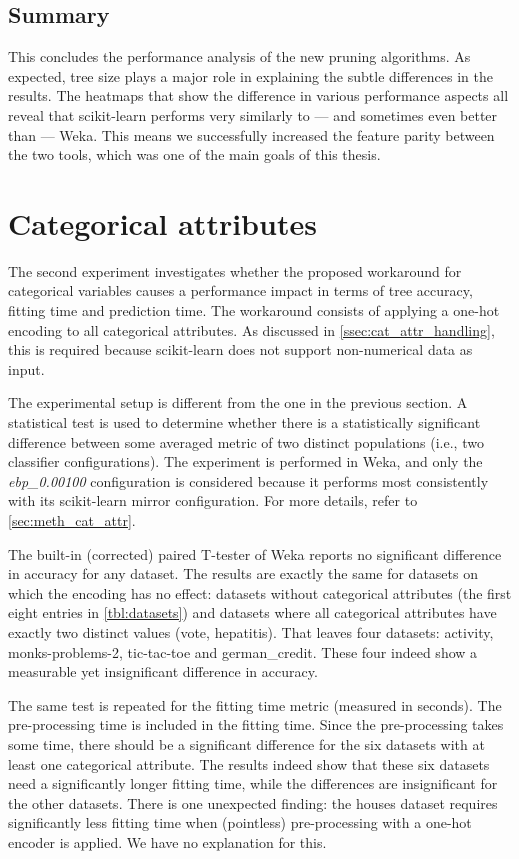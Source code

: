 \subsection{Summary}
This concludes the performance analysis of the new pruning algorithms. As expected, tree size plays a major role in explaining the subtle differences in the results. The heatmaps that show the difference in various performance aspects all reveal that scikit-learn performs very similarly to --- and sometimes even better than --- Weka. This means we successfully increased the feature parity between the two tools, which was one of the main goals of this thesis.

\section{Categorical attributes}
The second experiment investigates whether the proposed workaround for categorical variables causes a performance impact in terms of tree accuracy, fitting time and prediction time. The workaround consists of applying a one-hot encoding to all categorical attributes. As discussed in \autoref{ssec:cat_attr_handling}, this is required because scikit-learn does not support non-numerical data as input.

The experimental setup is different from the one in the previous section. A statistical test is used to determine whether there is a statistically significant difference between some averaged metric of two distinct populations (i.e., two classifier configurations). The experiment is performed in Weka, and only the \emph{ebp\_0.00100} configuration is considered because it performs most consistently with its scikit-learn mirror configuration. For more details, refer to \autoref{sec:meth_cat_attr}.

The built-in (corrected) paired T-tester of Weka reports no significant difference in accuracy for any dataset. The results are exactly the same for datasets on which the encoding has no effect: datasets without categorical attributes (the first eight entries in \autoref{tbl:datasets}) and datasets where all categorical attributes have exactly two distinct values (vote, hepatitis). That leaves four datasets: activity, monks-problems-2, tic-tac-toe and german\_credit. These four indeed show a measurable yet insignificant difference in accuracy.

The same test is repeated for the fitting time metric (measured in seconds). The pre-processing time is included in the fitting time. Since the pre-processing takes some time, there should be a significant difference for the six datasets with at least one categorical attribute. The results indeed show that these six datasets need a significantly longer fitting time, while the differences are insignificant for the other datasets. There is one unexpected finding: the houses dataset requires significantly less fitting time when (pointless) pre-processing with a one-hot encoder is applied. We have no explanation for this.

